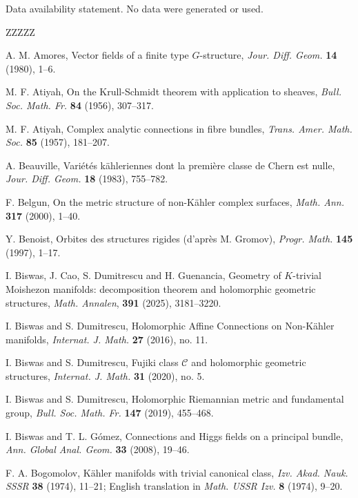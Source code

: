 \documentclass[12pt,reqno]{amsart}
\theoremstyle{definition}
\numberwithin{equation}{section}
\begin{document}
Data availability statement. No data were generated or used.


\begin{thebibliography}{ZZZZZ}

 A. M. Amores, Vector fields of a finite type $G$-structure, 
\textit{Jour. Diff. Geom.} \textbf{14} (1980), 1--6.

 M. F. Atiyah, On the Krull-Schmidt theorem with application to sheaves,
{\it Bull. Soc. Math. Fr.} {\bf 84} (1956), 307--317.

 M. F. Atiyah, Complex analytic connections in fibre
bundles, \textit{Trans. Amer. Math. Soc.} \textbf{85} (1957), 181--207.

 A. Beauville, Vari\'et\'es k\"ahleriennes dont la premi\`ere
classe de Chern est nulle, \textit{Jour. Diff. Geom.} \textbf{18} (1983), 755--782.

 F. Belgun, On the metric structure of non-K\"ahler complex surfaces, {\it Math. Ann.}
{\bf 317} (2000), 1--40.

 Y. Benoist, Orbites des structures rigides (d'apr\`es M. Gromov), \textit{Progr. Math.} 
{\bf 145} (1997), 1--17.

 I. Biswas, J. Cao, S. Dumitrescu and H. Guenancia, Geometry of $K$-trivial Moishezon 
manifolds: decomposition theorem and holomorphic geometric structures, {\it Math. Annalen}, {\bf 391} 
(2025), 3181--3220.

 I. Biswas and S. Dumitrescu, Holomorphic Affine Connections on Non-K\"ahler manifolds, 
\textit{Internat. J. Math.} {\bf 27} (2016), no. 11.

 I. Biswas and S. Dumitrescu, Fujiki class $\mathcal C$ and holomorphic geometric 
structures, {\it Internat. J. Math.} {\bf 31} (2020), no. 5.

 I. Biswas and S. Dumitrescu, Holomorphic Riemannian metric and fundamental group, {\it 
Bull. Soc. Math. Fr.} {\bf 147} (2019), 455--468.

 I. Biswas and T. L. G\'omez, Connections and Higgs fields on a principal bundle, {\it Ann. 
Global Anal. Geom.} {\bf 33} (2008), 19--46.

 F. A. Bogomolov, K\"ahler manifolds with trivial canonical class, \textit{Izv. Akad. 
Nauk. SSSR} {\bf 38} (1974), 11--21; English translation in \textit{ Math. USSR Izv.} {\bf 8} (1974), 
9--20.


\end{thebibliography}
\end{document}
